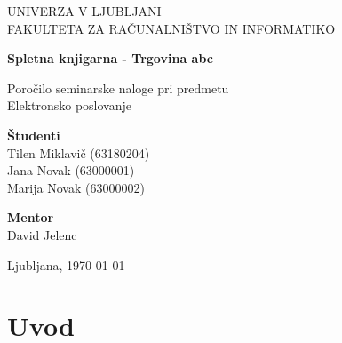 \documentclass[a4paper,12pt]{report}
\newcommand{\naslov}     {Spletna knjigarna - Trgovina abc}
\newcommand{\prviavtor}  {Tilen Miklavič}
\newcommand{\prviindeks} {63180204}
\newcommand{\drugiavtor} {Jana Novak}
\newcommand{\drugiindeks}{63000001}
\newcommand{\tretjiavtor} {Marija Novak}
\newcommand{\tretjiindeks}{63000002}
\newcommand{\kraj}       {Ljubljana}
\begin{document}
\begin{titlepage}
	\begin{center}
	{UNIVERZA V LJUBLJANI\\[10pt] 
	FAKULTETA ZA RAČUNALNIŠTVO IN INFORMATIKO}

	\vspace{65mm}

	{\Large\textbf{\naslov}}

	\vspace{10mm}

	{\large Poročilo seminarske naloge pri predmetu\\[10pt] Elektronsko poslovanje}

	\vfill
	\vspace{60mm}

\hspace{20mm}
\begin{minipage}[t]{70mm}
	{\bf Študenti}\\
	{\prviavtor} ({\prviindeks})\\ 
	{\drugiavtor} ({\drugiindeks})\\
	{\tretjiavtor} ({\tretjiindeks})
\end{minipage}
\begin{minipage}[t]{50mm}
	{\bf Mentor}\\
	David Jelenc
\end{minipage}

	\vspace{35mm}

	{	\kraj, \today}
	\end{center}
\end{titlepage}


\tableofcontents


\chapter{Uvod}
\end{document}
